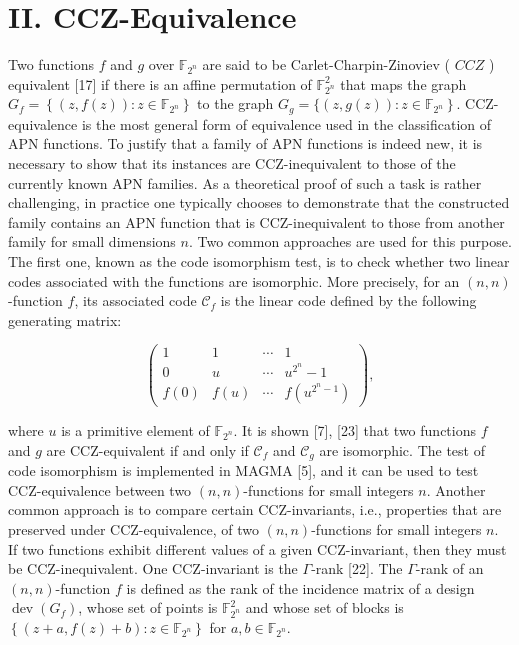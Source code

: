 \documentclass[10pt]{article}
\begin{document}
\section*{II. CCZ-Equivalence}
Two functions $f$ and $g$ over $\mathbb{F}_{2^{n}}$ are said to be Carlet-Charpin-Zinoviev ( $C C Z$ ) equivalent [17] if there is an affine permutation of $\mathbb{F}_{2^{n}}^{2}$ that maps the graph $G_{f}= \left\{(z, f(z)): z \in \mathbb{F}_{2^{n}}\right\}$ to the graph $G_{g}=\{(z, g(z)): \left.z \in \mathbb{F}_{2^{n}}\right\}$. CCZ-equivalence is the most general form of equivalence used in the classification of APN functions. To justify that a family of APN functions is indeed new, it is necessary to show that its instances are CCZ-inequivalent to those of the currently known APN families. As a theoretical proof of such a task is rather challenging, in practice one typically chooses to demonstrate that the constructed family contains an APN function that is CCZ-inequivalent to those from another family for small dimensions $n$. Two common approaches are used for this purpose. The first one, known as the code isomorphism test, is to check whether two linear codes associated with the functions are isomorphic. More precisely, for an $(n, n)$-function $f$, its associated code $\mathcal{C}_{f}$ is the linear code defined by the following generating matrix:

$$
\left(\begin{array}{cccc}
1 & 1 & \cdots & 1 \\
0 & u & \cdots & u^{2^{n}}-1 \\
f(0) & f(u) & \cdots & f\left(u^{2^{n}-1}\right)
\end{array}\right),
$$

where $u$ is a primitive element of $\mathbb{F}_{2^{n}}$. It is shown [7], [23] that two functions $f$ and $g$ are CCZ-equivalent if and only if $\mathcal{C}_{f}$ and $\mathcal{C}_{g}$ are isomorphic. The test of code isomorphism is implemented in MAGMA [5], and it can be used to test CCZ-equivalence between two $(n, n)$-functions for small integers $n$. Another common approach is to compare certain CCZ-invariants, i.e., properties that are preserved under CCZ-equivalence, of two $(n, n)$-functions for small integers $n$. If two functions exhibit different values of a given CCZ-invariant, then they must be CCZ-inequivalent. One CCZ-invariant is the $\Gamma$-rank [22]. The $\Gamma$-rank of an $(n, n)$-function $f$ is defined as the rank of the incidence matrix of a design $\operatorname{dev}\left(G_{f}\right)$, whose set of points is $\mathbb{F}_{2^{n}}^{2}$ and whose set of blocks is $\left\{(z+a, f(z)+b): z \in \mathbb{F}_{2^{n}}\right\}$ for $a, b \in \mathbb{F}_{2^{n}}$.
\end{document}

